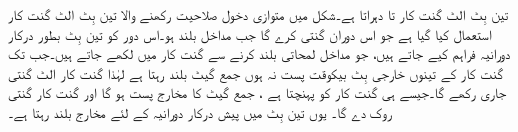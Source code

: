 تین بِٹ الٹ گنت کار  تا  دہراتا ہے۔شکل     میں متوازی دخول صلاحیت رکھنے والا تین بِٹ الٹ گنت کار استعمال کیا گیا ہے جو اس دوران گنتی کرے گا جب مداخل  بلند ہو۔اس دور کو تین بِٹ بطور درکار دورانیہ  فراہم کیے جاتے ہیں، جو  مداخل لمحاتی بلند کرنے سے گنت کار میں لکھے جاتے ہیں۔جب تک گنت کار کے تینوں خارجی بِٹ  بیکوقت پست  نہ ہوں جمع گیٹ بلند رہتا ہے  لہٰذا  گنت کار الٹ گنتی جاری رکھے گا۔جیسے ہی گنت کار  کو پہنچتا ہے ، جمع گیٹ کا مخارج پست ہو گا اور گنت کار گنتی روک دے گا۔  یوں تین بِٹ میں پیش درکار  دورانیہ   کے لئے مخارج   بلند رہتا ہے۔

